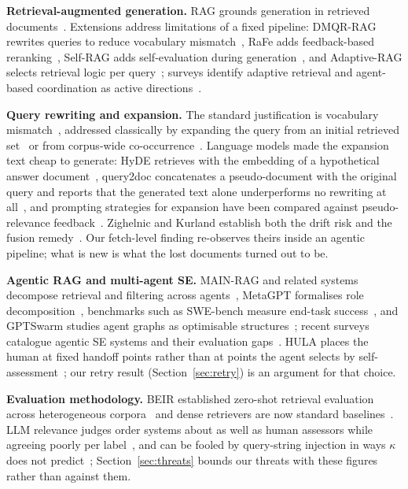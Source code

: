 \documentclass[10pt,conference]{IEEEtran}
\begin{document}
\textbf{Retrieval-augmented generation.} RAG grounds generation in retrieved
documents~\cite{lewis2020rag}. Extensions address limitations of a fixed
pipeline: DMQR-RAG rewrites queries to reduce vocabulary
mismatch~\cite{gao2024dmqr}, RaFe adds feedback-based
reranking~\cite{ma2023rafe}, Self-RAG adds self-evaluation during
generation~\cite{asai2024selfrag}, and Adaptive-RAG selects retrieval logic per
query~\cite{jeong2024adaptiverag}; surveys identify adaptive retrieval and
agent-based coordination as active directions~\cite{gao2023survey}.

\textbf{Query rewriting and expansion.} The standard justification is vocabulary
mismatch~\cite{furnas1987vocabulary}, addressed classically by expanding the query
from an initial retrieved set~\cite{rocchio1971relevance} or from corpus-wide
co-occurrence~\cite{xu1996localglobal,carpineto2012survey}. Language models made
the expansion text cheap to generate: HyDE retrieves with the embedding of a
hypothetical answer document~\cite{gao2023hyde}, query2doc concatenates a
pseudo-document with the original query and reports that the generated text alone
underperforms no rewriting at all~\cite{wang2023query2doc}, and prompting
strategies for expansion have been compared against pseudo-relevance
feedback~\cite{jagerman2023expansion}. Zighelnic and Kurland establish both the
drift risk and the fusion remedy~\cite{zighelnic2008drift}. Our fetch-level
finding re-observes theirs inside an agentic pipeline; what is new is what the lost
documents turned out to be.

\textbf{Agentic RAG and multi-agent SE.} MAIN-RAG and related systems decompose
retrieval and filtering across agents~\cite{wang2024mainrag,nguyen2025marag},
MetaGPT formalises role decomposition~\cite{hong2024metagpt}, benchmarks such as
SWE-bench measure end-task success~\cite{jimenez2024swebench}, and GPTSwarm
studies agent graphs as optimisable structures~\cite{zhuge2024}; recent surveys
catalogue agentic SE systems and their evaluation
gaps~\cite{he2025,liu2026agentsurvey,mamun2026blagent,guan2025,zheng2026,yang2026}.
HULA places the human at fixed handoff points rather than at points the agent
selects by self-assessment~\cite{takerngsaksiri2025hula}; our retry result
(Section~\ref{sec:retry}) is an argument for that choice.

\textbf{Evaluation methodology.} BEIR established zero-shot retrieval evaluation
across heterogeneous corpora~\cite{thakur2021beir} and dense retrievers are now
standard baselines~\cite{izacard2022contriever}. LLM relevance judges order
systems about as well as human assessors while agreeing poorly per
label~\cite{upadhyay2024umbrela,thomas2024preferences,faggioli2023perspectives},
and can be fooled by query-string injection in ways $\kappa$ does not
predict~\cite{alaofi2024fooled}; Section~\ref{sec:threats} bounds our threats with
these figures rather than against them.
\end{document}
